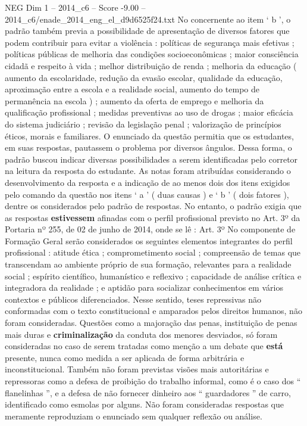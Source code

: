 \begin{textsample}{NEG Dim 1 – 2014\_c6 – Score -9.00 – 2014\_c6/enade\_2014\_eng\_el\_d9d6525f24.txt}
No concernente ao item ‘ b ’, o padrão também previa a possibilidade de apresentação de diversos fatores que podem contribuir para evitar a violência : políticas de segurança mais efetivas ; políticas públicas de melhoria das condições socioeconômicas ; maior consciência cidadã e respeito à vida ; melhor distribuição de renda ; melhoria da educação ( aumento da escolaridade, redução da evasão escolar, qualidade da educação, aproximação entre a escola e a realidade social, aumento do tempo de permanência na escola ) ; aumento da oferta de emprego e melhoria da qualificação profissional ; medidas preventivas ao uso de drogas ; maior eficácia do sistema judiciário ; revisão da legislação penal ; valorização de princípios éticos, morais e familiares.
O enunciado da questão permitia que os estudantes, em suas respostas, pautassem o problema por diversos ângulos.
Dessa forma, o padrão buscou indicar diversas possibilidades a serem identificadas pelo corretor na leitura da resposta do estudante.
As notas foram atribuídas considerando o desenvolvimento da resposta e a indicação de ao menos dois dos itens exigidos pelo comando da questão nos itens ‘ a ’ ( duas causas ) e ‘ b ’ ( dois fatores ), dentre os considerados pelo padrão de respostas.
No entanto, o padrão exigia que as respostas \textbf{estivessem} afinadas com o perfil profissional previsto no Art. 3º da Portaria nº 255, de 02 de junho de 2014, onde se lê : Art. 3º No componente de Formação Geral serão considerados os seguintes elementos integrantes do perfil profissional : atitude ética ; comprometimento social ; compreensão de temas que transcendam ao ambiente próprio de sua formação, relevantes para a realidade social ; espírito científico, humanístico e reflexivo ; capacidade de análise crítica e integradora da realidade ; e aptidão para socializar conhecimentos em vários contextos e públicos diferenciados.
Nesse sentido, teses repressivas não conformadas com o texto constitucional e amparados pelos direitos humanos, não foram consideradas.
Questões como a majoração das penas, instituição de penas mais duras e \textbf{criminalização} da conduta dos menores desviados, só foram consideradas no caso de serem tratadas como menção a um debate que \textbf{está} presente, nunca como medida a ser aplicada de forma arbitrária e inconstitucional.
Também não foram previstas visões mais autoritárias e repressoras como a defesa de proibição do trabalho informal, como é o caso dos “ flanelinhas ”, e a defesa de não fornecer dinheiro aos “ guardadores ” de carro, identificado como esmolas por alguns.
Não foram consideradas respostas que meramente reproduziam o enunciado sem qualquer reflexão ou análise.

\end{textsample}
